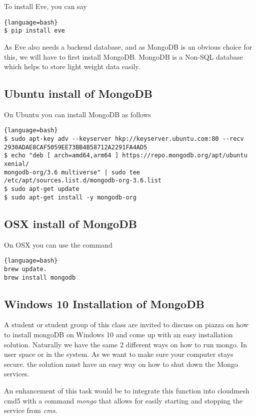 To install Eve, you can say 

\begin{lstlisting}{language=bash}
$ pip install eve
\end{lstlisting}

As Eve also needs a backend database, and as MongoDB is an obvious
choice for this, we will have to first install MongoDB.  MongoDB is a Non-SQL
database which helps to store light weight data easily.

\subsection{Ubuntu install of MongoDB}
On Ubuntu you can install MongoDB as follows

\begin{lstlisting}{language=bash}
$ sudo apt-key adv --keyserver hkp://keyserver.ubuntu.com:80 --recv 2930ADAE8CAF5059EE73BB4B58712A2291FA4AD5
$ echo "deb [ arch=amd64,arm64 ] https://repo.mongodb.org/apt/ubuntu xenial/
mongodb-org/3.6 multiverse" | sudo tee /etc/apt/sources.list.d/mongodb-org-3.6.list
$ sudo apt-get update
$ sudo apt-get install -y mongodb-org
\end{lstlisting}

\subsection{OSX install of MongoDB}

On OSX you can use the command

\begin{lstlisting}{language=bash}
brew update.
brew install mongodb
\end{lstlisting}

\subsection{Windows 10 Installation of MongoDB}

\begin{exercise}

A student or student group of this class are invited to discuss on
piazza on how to install mongoDB on Windows 10 and come up with an
easy installation solution. Naturally we have the same 2 different ways
on how to run mongo. In user space or in the system. As we want to
make sure your computer stays secure. the solution must have an easy
way on how to shut down the Mongo services.

An enhancement of this task would be to integrate this function into
cloudmesh cmd5 with a command {\em mongo} that allows for easily
starting and stopping the service from {\em cms}.
\end{exercise}


